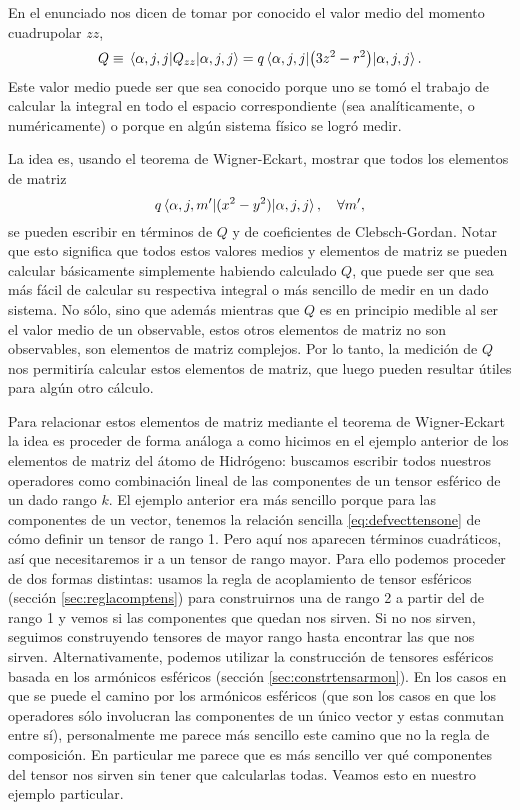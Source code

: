 \documentclass[10pt, a4paper]{article}
\numberwithin{equation}{subsection}
\begin{document}
En el enunciado nos dicen de tomar por conocido el valor medio del momento
cuadrupolar $zz$,
\begin{equation}
  Q \equiv \expval{Q_{zz}}{\alpha,j,j} = q\expval{\left(3z^2 -
    r^2\right)}{\alpha,j,j}.
\end{equation}
Este valor medio puede ser que sea conocido porque uno se tomó el trabajo de
calcular la integral en todo el espacio correspondiente (sea analíticamente, o
numéricamente) o porque en algún sistema físico se logró medir.

La idea es, usando el teorema de Wigner-Eckart, mostrar que todos los elementos
de matriz
\begin{equation}
  q\matrixel{\alpha,j,m'}{(x^2 - y^2)}{\alpha,j,j}, \quad \forall m',
\end{equation}
se pueden escribir en términos de $Q$ y de coeficientes de Clebsch-Gordan.
Notar que esto significa que todos estos valores medios y elementos de matriz
se pueden calcular básicamente simplemente habiendo calculado $Q$, que puede
ser que sea más fácil de calcular su respectiva integral o más sencillo de
medir en un dado sistema. No sólo, sino que además mientras que $Q$ es en
principio medible al ser el valor medio de un observable, estos otros elementos
de matriz no son observables, son elementos de matriz complejos. Por lo tanto,
la medición de $Q$ nos permitiría calcular estos elementos de matriz, que luego
pueden resultar útiles para algún otro cálculo.

Para relacionar estos elementos de matriz mediante el teorema de Wigner-Eckart
la idea es proceder de forma análoga a como hicimos en el ejemplo anterior de
los elementos de matriz del átomo de Hidrógeno: buscamos escribir todos
nuestros operadores como combinación lineal de las componentes de un tensor
esférico de un dado rango $k$. El ejemplo anterior era más sencillo porque para
las componentes de un vector, tenemos la relación sencilla
\eqref{eq:defvecttensone} de cómo definir un tensor de rango 1. Pero aquí nos
aparecen términos cuadráticos, así que necesitaremos ir a un tensor de rango
mayor. Para ello podemos proceder de dos formas distintas: usamos la regla de
acoplamiento de tensor esféricos (sección \ref{sec:reglacomptens}) para
construirnos una de rango 2 a partir del de rango 1 y vemos si las componentes
que quedan nos sirven. Si no nos sirven, seguimos construyendo tensores de
mayor rango hasta encontrar las que nos sirven. Alternativamente, podemos
utilizar la construcción de tensores esféricos basada en los armónicos
esféricos (sección \ref{sec:constrtensarmon}). En los casos en que se puede el
camino por los armónicos esféricos (que son los casos en que los operadores
sólo involucran las componentes de un único vector y estas conmutan entre sí),
personalmente me parece más sencillo este camino que no la regla de
composición. En particular me parece que es más sencillo ver qué componentes
del tensor nos sirven sin tener que calcularlas todas. Veamos esto en nuestro
ejemplo particular.
\end{document}
